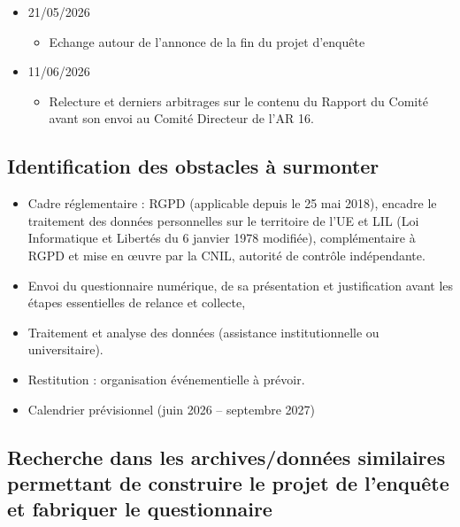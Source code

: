 \documentclass[10pt,a4paper]{article}
\begin{document}
\begin{itemize}
\begin{itemize}
\item Partage d'une analyse de l'annuaire de l'Union-IHEDN 2022 consacrée au vivier des auditeurs et aux limites du potentiel réellement mobilisable en cas de crise majeure.
\item Le rapport a été approfondi et le positionnement de l'AR 16 y est désormais davantage clarifié comme acteur de contribution indirecte mais stratégique, principalement en amont et en aval des crises, autour des enjeux de préparation, de culture stratégique, d'analyse et de retour d'expérience.
\end{itemize}
\item 21/05/2026
\begin{itemize}
\item Echange autour de l'annonce de la fin du projet d'enquête
\end{itemize}
\item 11/06/2026
\begin{itemize}
\item Relecture et derniers arbitrages sur le contenu du Rapport du Comité avant son envoi au Comité Directeur de l'AR 16.
\end{itemize}
\end{itemize}
\subsection{Identification des obstacles à surmonter}
\begin{itemize}
\item Cadre réglementaire : RGPD (applicable depuis le 25 mai 2018), encadre le traitement des données personnelles sur le territoire de l'UE et LIL (Loi Informatique et Libertés du 6 janvier 1978 modifiée), complémentaire à RGPD et mise en œuvre par la CNIL, autorité de contrôle indépendante.
\item Envoi du questionnaire numérique, de sa présentation et justification avant les étapes essentielles de relance et collecte, 
\item Traitement et analyse des données (assistance institutionnelle ou universitaire).
\item Restitution : organisation événementielle à prévoir.
\item Calendrier prévisionnel (juin 2026 -- septembre 2027)
\end{itemize}
\subsection{Recherche dans les archives/données similaires permettant de construire le projet de l'enquête et fabriquer le questionnaire}
\end{document}
